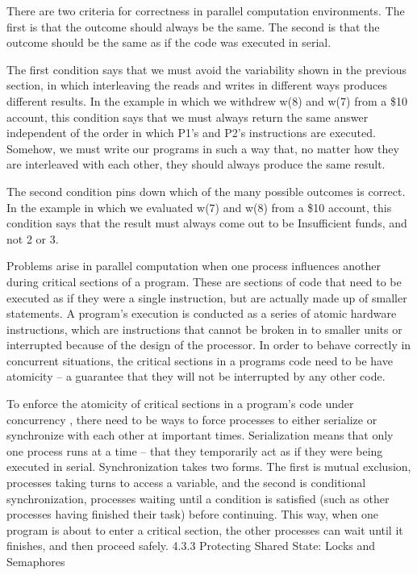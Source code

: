 \documentclass[letterpaper,10pt,dvipdfmx]{sphinxmanual}
\begin{document}
There are two criteria for correctness in parallel computation environments. The first is that the outcome should always be the same. The second is that the outcome should be the same as if the code was executed in serial.

The first condition says that we must avoid the variability shown in the previous section, in which interleaving the reads and writes in different ways produces different results. In the example in which we withdrew w(8) and w(7) from a \$10 account, this condition says that we must always return the same answer independent of the order in which P1's and P2's instructions are executed. Somehow, we must write our programs in such a way that, no matter how they are interleaved with each other, they should always produce the same result.

The second condition pins down which of the many possible outcomes is correct. In the example in which we evaluated w(7) and w(8) from a \$10 account, this condition says that the result must always come out to be Insufficient funds, and not 2 or 3.

Problems arise in parallel computation when one process influences another during critical sections of a program. These are sections of code that need to be executed as if they were a single instruction, but are actually made up of smaller statements. A program's execution is conducted as a series of atomic hardware instructions, which are instructions that cannot be broken in to smaller units or interrupted because of the design of the processor. In order to behave correctly in concurrent situations, the critical sections in a programs code need to be have atomicity -- a guarantee that they will not be interrupted by any other code.

To enforce the atomicity of critical sections in a program's code under concurrency , there need to be ways to force processes to either serialize or synchronize with each other at important times. Serialization means that only one process runs at a time -- that they temporarily act as if they were being executed in serial. Synchronization takes two forms. The first is mutual exclusion, processes taking turns to access a variable, and the second is conditional synchronization, processes waiting until a condition is satisfied (such as other processes having finished their task) before continuing. This way, when one program is about to enter a critical section, the other processes can wait until it finishes, and then proceed safely.
4.3.3   Protecting Shared State: Locks and Semaphores
\end{document}

